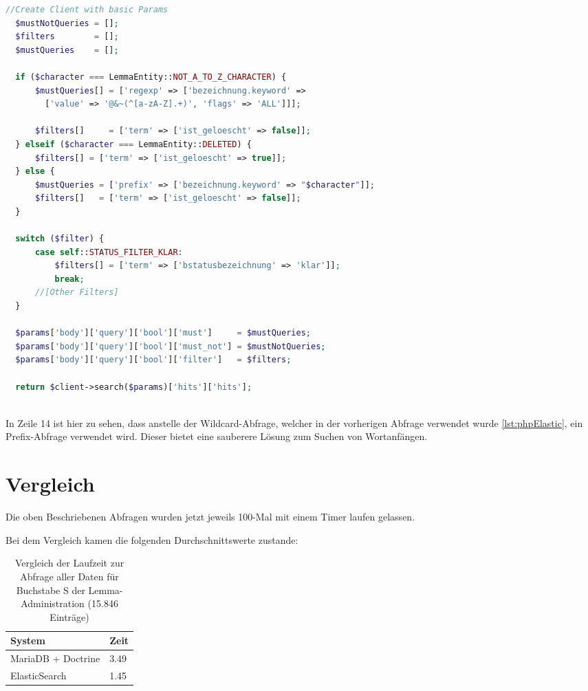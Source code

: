 \begin{lstlisting}[language=PHP, frame=single, label={lst:queryEla}] 
  //Create Client with basic Params
  $mustNotQueries = [];
  $filters        = [];
  $mustQueries    = [];

  if ($character === LemmaEntity::NOT_A_TO_Z_CHARACTER) {
      $mustQueries[] = ['regexp' => ['bezeichnung.keyword' => 
        ['value' => '@&~(^[a-zA-Z].+)', 'flags' => 'ALL']]];
        
      $filters[]     = ['term' => ['ist_geloescht' => false]];
  } elseif ($character === LemmaEntity::DELETED) {
      $filters[] = ['term' => ['ist_geloescht' => true]];
  } else {
      $mustQueries = ['prefix' => ['bezeichnung.keyword' => "$character"]];
      $filters[]   = ['term' => ['ist_geloescht' => false]];
  }

  switch ($filter) {
      case self::STATUS_FILTER_KLAR:
          $filters[] = ['term' => ['bstatusbezeichnung' => 'klar']];
          break;
      //[Other Filters]
  }

  $params['body']['query']['bool']['must']     = $mustQueries;
  $params['body']['query']['bool']['must_not'] = $mustNotQueries;
  $params['body']['query']['bool']['filter']   = $filters;

  return $client->search($params)['hits']['hits'];
  
\end{lstlisting}

In Zeile 14 ist hier zu sehen, dass anstelle der Wildcard-Abfrage, welcher in der vorherigen Abfrage verwendet wurde \ref{lst:phpElastic}, ein Prefix-Abfrage verwendet wird. Dieser bietet eine sauberere Lösung zum Suchen von Wortanfängen.

\section{Vergleich}

Die oben Beschriebenen Abfragen wurden jetzt jeweils 100-Mal mit einem Timer laufen gelassen. 

Bei dem Vergleich kamen die folgenden Durchschnittswerte zustande:
\begin{table} %
	\centering
		\begin{tabular}{l | l }
		    \textbf{System} & \textbf{Zeit} \\
        \hline
        MariaDB + Doctrine & 3.49 \\
        ElasticSearch      & 1.45  \\
		\end{tabular}
    \caption{Vergleich der Laufzeit zur Abfrage aller Daten für Buchstabe S der Lemma-Administration (15.846 Einträge)}
    \label{vlgTimeDBvsEla}
\end{table}

